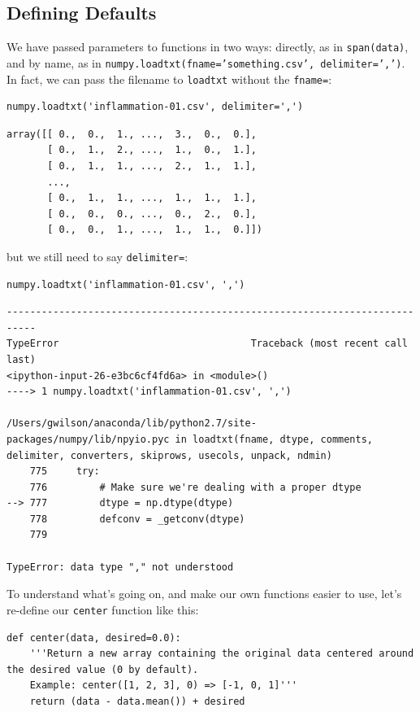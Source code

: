 \documentclass[]{book}
\begin{document}
\subsection{Defining Defaults}

We have passed parameters to functions in two ways: directly, as in
\texttt{span(data)}, and by name, as in
\texttt{numpy.loadtxt(fname='something.csv', delimiter=',')}. In fact,
we can pass the filename to \texttt{loadtxt} without the
\texttt{fname=}:

\begin{verbatim}
numpy.loadtxt('inflammation-01.csv', delimiter=',')
\end{verbatim}

\begin{verbatim}
array([[ 0.,  0.,  1., ...,  3.,  0.,  0.],
       [ 0.,  1.,  2., ...,  1.,  0.,  1.],
       [ 0.,  1.,  1., ...,  2.,  1.,  1.],
       ...,
       [ 0.,  1.,  1., ...,  1.,  1.,  1.],
       [ 0.,  0.,  0., ...,  0.,  2.,  0.],
       [ 0.,  0.,  1., ...,  1.,  1.,  0.]])
\end{verbatim}

but we still need to say \texttt{delimiter=}:

\begin{verbatim}
numpy.loadtxt('inflammation-01.csv', ',')
\end{verbatim}

\begin{verbatim}
---------------------------------------------------------------------------
TypeError                                 Traceback (most recent call last)
<ipython-input-26-e3bc6cf4fd6a> in <module>()
----> 1 numpy.loadtxt('inflammation-01.csv', ',')

/Users/gwilson/anaconda/lib/python2.7/site-packages/numpy/lib/npyio.pyc in loadtxt(fname, dtype, comments, delimiter, converters, skiprows, usecols, unpack, ndmin)
    775     try:
    776         # Make sure we're dealing with a proper dtype
--> 777         dtype = np.dtype(dtype)
    778         defconv = _getconv(dtype)
    779

TypeError: data type "," not understood
\end{verbatim}

To understand what's going on, and make our own functions easier to use,
let's re-define our \texttt{center} function like this:

\begin{verbatim}
def center(data, desired=0.0):
    '''Return a new array containing the original data centered around the desired value (0 by default).
    Example: center([1, 2, 3], 0) => [-1, 0, 1]'''
    return (data - data.mean()) + desired
\end{verbatim}
\end{document}
